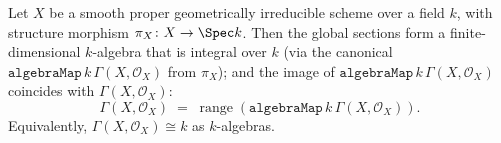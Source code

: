 \begin{lemma}
  \label{lem:constants_integral_over_base_field}
  Let \(X\) be a smooth proper geometrically irreducible scheme over a field \(k\), with structure morphism \(\pi_X \colon X \to \Spec k\). Then the global sections form a finite-dimensional \(k\)-algebra that is integral over \(k\) (via the canonical \(\mathtt{algebraMap}\,k\,\Gamma(X, \mathcal O_X)\) from \(\pi_X\)); and the image of \(\mathtt{algebraMap}\,k\,\Gamma(X, \mathcal O_X)\) coincides with \(\Gamma(X, \mathcal O_X)\):
  \[
    \Gamma(X, \mathcal O_X) \;=\; \operatorname{range}(\mathtt{algebraMap}\,k\,\Gamma(X, \mathcal O_X)).
  \]
  Equivalently, \(\Gamma(X, \mathcal O_X) \cong k\) as \(k\)-algebras.


\end{lemma}

